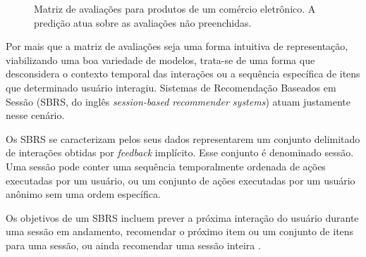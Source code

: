 \begin{figure}[h]
    \centering
      \caption{Matriz de avaliações para produtos de um comércio eletrônico. A predição atua sobre as avaliações não preenchidas.}
      \label{fig:matriz_15}
\end{figure}

Por mais que a matriz de avaliações seja uma forma intuitiva de representação,
viabilizando uma boa variedade de modelos, trata-se de uma forma que
desconsidera o contexto temporal das interações ou a sequência específica de
itens que determinado usuário interagiu. Sistemas de Recomendação Baseados em
Sessão (SBRS, do inglês \textit{session-based recommender systems}) atuam
justamente nesse cenário.

Os SBRS se caracterizam pelos seus dados representarem um conjunto delimitado
de interações obtidas por \textit{feedback} implícito. Esse conjunto é
denominado sessão. Uma sessão pode conter uma sequência temporalmente ordenada
de ações executadas por um usuário, ou um conjunto de ações executadas por um
usuário anônimo sem uma ordem específica.

Os objetivos de um SBRS incluem
prever a próxima interação do usuário durante uma sessão em andamento,
recomendar o próximo item ou um conjunto de itens para uma sessão, ou ainda
recomendar uma sessão inteira \cite{domingues_large_2023, survey_wang_2021}.


